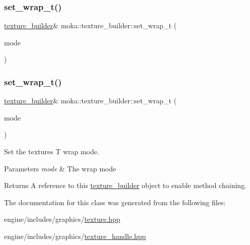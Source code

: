 \subsubsection{\texorpdfstring{set\_wrap\_t()}{set\_wrap\_t()}\hspace{0.1cm}{\footnotesize\ttfamily [1/2]}}
{\footnotesize\ttfamily \mbox{\hyperlink{classmoka_1_1texture__builder}{texture\+\_\+builder}}\& moka\+::texture\+\_\+builder\+::set\+\_\+wrap\+\_\+t (\begin{DoxyParamCaption}\item[{\mbox{\hyperlink{namespacemoka_afda3faa87bacaacc6008d8c1f73f6462}{wrap\+\_\+mode}}}]{mode }\end{DoxyParamCaption})}

\mbox{\label{classmoka_1_1texture__builder_a450b409d8c9fac1a54c89130825a6c9f}} 
\subsubsection{\texorpdfstring{set\_wrap\_t()}{set\_wrap\_t()}\hspace{0.1cm}{\footnotesize\ttfamily [2/2]}}
{\footnotesize\ttfamily \mbox{\hyperlink{classmoka_1_1texture__builder}{texture\+\_\+builder}}\& moka\+::texture\+\_\+builder\+::set\+\_\+wrap\+\_\+t (\begin{DoxyParamCaption}\item[{\mbox{\hyperlink{namespacemoka_afda3faa87bacaacc6008d8c1f73f6462}{wrap\+\_\+mode}}}]{mode }\end{DoxyParamCaption})}



Set the texture\textquotesingle{}s T wrap mode. 


\begin{DoxyParams}{Parameters}
{\em mode} & The wrap mode \\
\hline
\end{DoxyParams}
\begin{DoxyReturn}{Returns}
A reference to this \mbox{\hyperlink{classmoka_1_1texture__builder}{texture\+\_\+builder}} object to enable method chaining. 
\end{DoxyReturn}


The documentation for this class was generated from the following files\+:\begin{DoxyCompactItemize}
\item 
engine/includes/graphics/\mbox{\hyperlink{texture_8hpp}{texture.\+hpp}}\item 
engine/includes/graphics/\mbox{\hyperlink{texture__handle_8hpp}{texture\+\_\+handle.\+hpp}}\end{DoxyCompactItemize}
